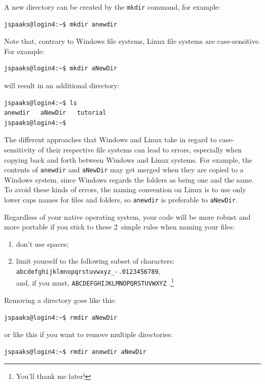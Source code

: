 A new directory can be created by the \texttt{mkdir} command, for example:
\begin{lstlisting}[style=basic,style=bash]
jspaaks@login4:~$ mkdir anewdir
\end{lstlisting}
Note that, contrary to Windows file systems, Linux file systems are case-sensitive. For example:
\begin{lstlisting}[style=basic,style=bash]
jspaaks@login4:~$ mkdir aNewDir
\end{lstlisting}
will result in an additional directory:
\begin{lstlisting}[style=basic,style=bash]
jspaaks@login4:~$ ls
anewdir   aNewDir   tutorial
jspaaks@login4:~$ 
\end{lstlisting}
The different approaches that Windows and Linux take in regard to case-sensitivity of their respective file systems can lead to errors, especially when copying back and forth between Windows and Linux systems. For example, the contents of \lstinline{anewdir} and \lstinline{aNewDir} may get merged when they are copied to a Windows system, since Windows regards the folders as being one and the same. To avoid these kinds of errors, the naming convention on Linux is to use only lower caps names for files and folders, so \lstinline{anewdir} is preferable to  \lstinline{aNewDir}. 

Regardless of your native operating system, your code will be more robust and more portable if you stick to these 2~simple rules when naming your files:
\begin{enumerate}
\item{don't use spaces;}
\item{limit yourself to the following subset of characters:\\ \lstinline[style=bashinline]{abcdefghijklmnopqrstuvwxyz_-.0123456789},\\ and, if you must, \lstinline[style=bashinline]{ABCDEFGHIJKLMNOPQRSTUVWXYZ} .}\footnote{You'll thank me later!}
\end{enumerate}



Removing a directory goes like this:
\begin{lstlisting}[style=basic,style=bash]
jspaaks@login4:~$ rmdir aNewDir
\end{lstlisting}
or like this if you want to remove multiple directories:
\begin{lstlisting}[style=basic,style=bash]
jspaaks@login4:~$ rmdir anewdir aNewDir 
\end{lstlisting}


